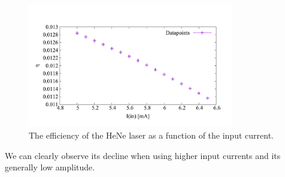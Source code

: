 \documentclass[../main.tex]{subfiles}
\begin{document}
    \begin{figure}[H]
        \centering
        \includegraphics[width=0.8\textwidth]{Bilddateien/2/efficiency-over-in-current.png}
        \caption{The efficiency of the HeNe laser as a function of the input current.}
        \label{fig:efficiency_over_input_current}
    \end{figure}
    We can clearly observe its decline when using higher input currents and its generally low amplitude. 
\end{document}
